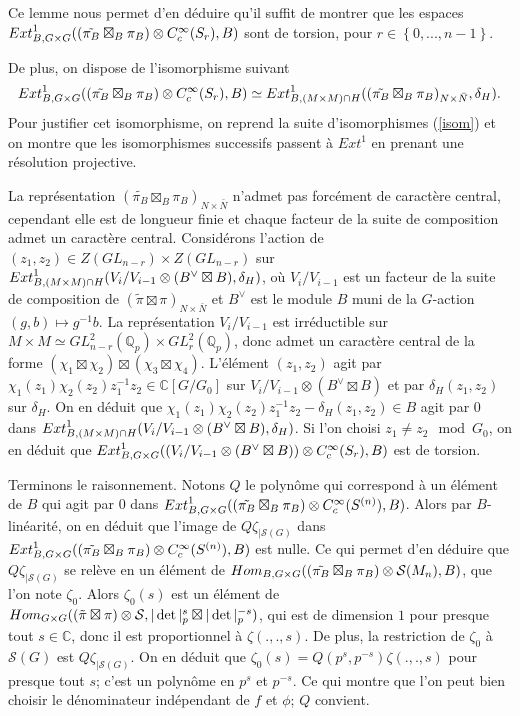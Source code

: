 Ce lemme nous permet d'en déduire qu'il suffit de montrer que les espaces $\operatorname{\mathnormal{Ext}}^1_{B, G \times G}((\tilde{\pi_B} \boxtimes_B \pi_B) \otimes C^\infty_c(S_r), B)$ sont de torsion, pour $r \in \left\lbrace 0, ..., n-1 \right\rbrace$.

De plus, on dispose de l'isomorphisme suivant
\begin{equation}
\operatorname{\mathnormal{Ext}}^1_{B, G \times G}((\tilde{\pi_B} \boxtimes_B \pi_B) \otimes C^\infty_c(S_r), B) \simeq \operatorname{\mathnormal{Ext}}^1_{B, (M \times M) \cap H}((\tilde{\pi_B} \boxtimes_B \pi_B)_{N \times \bar{N}}, \delta_H).
\end{equation}
Pour justifier cet isomorphisme, on reprend la suite d'isomorphismes (\ref{isom}) et on montre que les isomorphismes successifs passent à $Ext^1$ en prenant une résolution projective.

La représentation $(\tilde{\pi_B} \boxtimes_B \pi_B)_{N \times \bar{N}}$ n'admet pas forcément de caractère central, cependant elle est de longueur finie et chaque facteur de la suite de composition admet un caractère central. Considérons l'action de $(z_1,z_2) \in Z(GL_{n-r}) \times Z(GL_{n-r})$ sur $\operatorname{\mathnormal{Ext}}^1_{B, (M \times M) \cap H}(V_i/V_{i-1} \otimes (B^{\vee} \boxtimes B), \delta_H)$, où $V_{i}/V_{i-1}$ est un facteur de la suite de composition de $(\tilde{\pi} \boxtimes \pi)_{N \times \bar{N}}$ et $B^{\vee}$ est le module $B$ muni de la $G$-action $(g, b) \mapsto g^{-1}b$. La représentation $V_{i}/V_{i-1}$ est irréductible sur $M \times M \simeq GL_{n-r}^2(\mathbb{Q}_p) \times GL_r^2(\mathbb{Q}_p)$, donc admet un caractère central de la forme $(\chi_1 \boxtimes \chi_2) \boxtimes (\chi_3 \boxtimes \chi_4)$. L'élément $(z_1,z_2)$ agit par $\chi_1(z_1)\chi_2(z_2)z_1^{-1}z_2 \in \mathbb{C}[G/G_0]$ sur $V_i/V_{i-1} \otimes (B^{\vee} \boxtimes B)$ et par $\delta_H(z_1,z_2)$ sur $\delta_H$. On en déduit que $\chi_1(z_1)\chi_2(z_2)z_1^{-1}z_2-\delta_H(z_1,z_2) \in B$ agit par $0$ dans $\operatorname{\mathnormal{Ext}}^1_{B, (M \times M) \cap H}(V_i/V_{i-1} \otimes (B^{\vee} \boxtimes B), \delta_H)$. Si l'on choisi $z_1 \neq z_2 \mod G_0$, on en déduit que $\operatorname{\mathnormal{Ext}}^1_{B, G \times G}((V_i/V_{i-1} \otimes (B^{\vee} \boxtimes B)) \otimes C^\infty_c(S_r), B)$ est de torsion.

Terminons le raisonnement. Notons $Q$ le polynôme qui correspond à un élément de $B$ qui agit par $0$ dans $\operatorname{\mathnormal{Ext}}^1_{B, G \times G}((\tilde{\pi_B} \boxtimes_B \pi_B) \otimes C^\infty_c(S^{(n)}), B)$. Alors par $B$-linéarité, on en déduit que l'image de $Q\zeta_{|\mathcal{S}(G)}$ dans $\operatorname{\mathnormal{Ext}}^1_{B, G \times G}((\tilde{\pi_B} \boxtimes_B \pi_B) \otimes C^\infty_c(S^{(n)}), B)$ est nulle. Ce qui permet d'en déduire que $Q\zeta_{|\mathcal{S}(G)}$ se relève en un élément de $\operatorname{\mathnormal{Hom}}_{B, G \times G}((\tilde{\pi_B} \boxtimes_B \pi_B) \otimes \mathcal{S}(M_n), B)$, que l'on note $\zeta_0$. Alors $\zeta_0(s)$ est un élément de $\operatorname{\mathnormal{Hom}}_{G \times G} ( (\tilde{\pi} \boxtimes \pi) \otimes \mathcal{S}, |\det|_p^s \boxtimes |\det|_p^{-s})$, qui est de dimension $1$ pour presque tout $s \in \mathbb{C}$, donc il est proportionnel à $\zeta(., ., s)$. De plus, la restriction de $\zeta_0$ à $\mathcal{S}(G)$ est $Q\zeta_{|\mathcal{S}(G)}$. On en déduit que $\zeta_0(s) = Q(p^s, p^{-s})\zeta(.,.,s)$ pour presque tout $s$; c'est un polynôme en $p^s$ et $p^{-s}$. Ce qui montre que l'on peut bien choisir le dénominateur indépendant de $f$ et $\phi$; $Q$ convient.